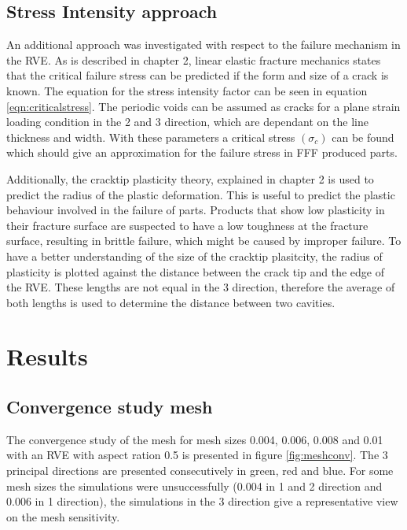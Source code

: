 \subsection{Stress Intensity approach}
An additional approach was investigated with respect to the failure mechanism in the RVE. As is described in chapter 2, linear elastic fracture mechanics states that the critical failure stress can be predicted if the form and size of a crack is known. The equation for the stress intensity factor can be seen in equation \ref{eqn:criticalstress}. The periodic voids can be assumed as cracks for a plane strain loading condition in the 2 and 3 direction, which are dependant on the line thickness and width. With these parameters a critical stress $(\sigma_c)$ can be found which should give an approximation for the failure stress in FFF produced parts. 

Additionally, the cracktip plasticity theory, explained in chapter 2 is used to predict the radius of the plastic deformation. This is useful to predict the plastic behaviour involved in the failure of parts. Products that show low plasticity in their fracture surface are suspected to have a low toughness at the fracture surface, resulting in brittle failure, which might be caused by improper failure. To have a better understanding of the size of the cracktip plasitcity, the radius of plasticity is plotted against the distance between the crack tip and the edge of the RVE. These lengths are not equal in the 3 direction, therefore the average of both lengths is used to determine the distance between two cavities. 

\section{Results}
\subsection{Convergence study mesh}
The convergence study of the mesh for mesh sizes 0.004, 0.006, 0.008 and 0.01 with an RVE with aspect ration 0.5 is presented in figure \ref{fig:meshconv}. The 3 principal directions are presented consecutively in green, red and blue. For some mesh sizes the simulations were unsuccessfully (0.004 in 1 and 2 direction and 0.006 in 1 direction), the simulations in the 3 direction give a representative view on the mesh sensitivity.  

